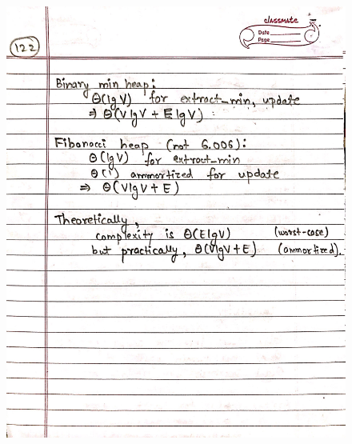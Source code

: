 \begin{figure}[H]
    \centering
    \includegraphics[scale=0.25]{"./MIT-6.006/MIT-6006-122"}
\end{figure}
\newpage

